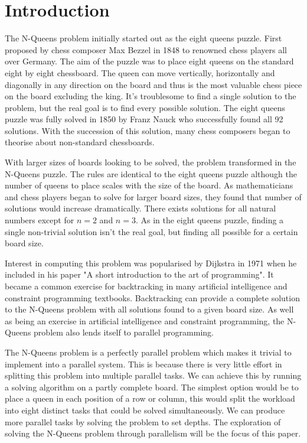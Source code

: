 \chapter{Introduction}\label{chap:intro}
The N-Queens problem initially started out as the eight queens puzzle. First proposed by chess composer Max Bezzel in 1848 to renowned chess players all over Germany\cite{bezzel}. The aim of the puzzle was to place eight queens on the standard eight by eight chessboard. The queen can move vertically, horizontally and diagonally in any direction on the board and thus is the most valuable chess piece on the board excluding the king. It's troublesome to find a single solution to the problem, but the real goal is to find every possible solution. The eight queens puzzle was fully solved in 1850 by Franz Nauck who successfully found all 92 solutions\cite{Nauck}. With the succession of this solution, many chess composers began to theorise about non-standard chessboards.
	
With larger sizes of boards looking to be solved, the problem transformed in the N-Queens puzzle. The rules are identical to the eight queens puzzle although the number of queens to place scales with the size of the board. As mathematicians and chess players began to solve for larger board sizes, they found that number of solutions would increase dramatically. There exists solutions for all natural numbers except for \(n = 2\) and \(n = 3\)\cite{hoffman}. As in the eight queens puzzle, finding a single non-trivial solution isn't the real goal, but finding all possible for a certain board size. 
    
Interest in computing this problem was popularised by Dijkstra in 1971 when he included in his paper "A short introduction to the art of programming"\cite{dijstra}. It became a common exercise for backtracking in many artificial intelligence and constraint programming textbooks. Backtracking can provide a complete solution to the N-Queens problem with all solutions found to a given board size. As well as being an exercise in artificial intelligence and constraint programming, the N-Queens problem also lends itself to parallel programming. 
    
The N-Queens problem is a perfectly parallel problem which makes it trivial to implement into a parallel system. This is because there is very little effort in splitting this problem into multiple parallel tasks. We can achieve this by running a solving algorithm on a partly complete board. The simplest option would be to place a queen in each position of a row or column, this would split the workload into eight distinct tasks that could be solved simultaneously. We can produce more parallel tasks by solving the problem to set depths. The exploration of solving the N-Queens problem through parallelism will be the focus of this paper.   
    

